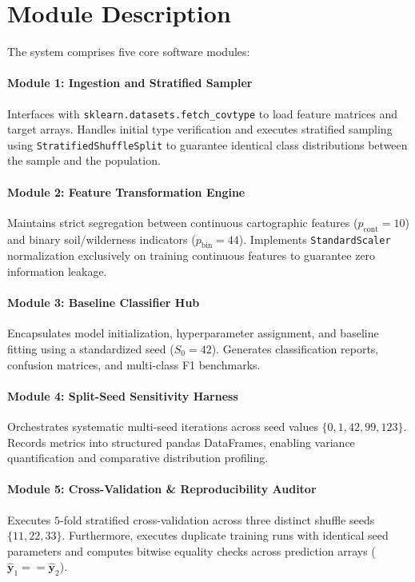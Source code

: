\section{Module Description}
\label{sec:module_description}

The system comprises five core software modules:

\paragraph{Module 1: Ingestion and Stratified Sampler}
Interfaces with \texttt{sklearn.datasets.fetch\_covtype} to load feature matrices and target arrays. Handles initial type verification and executes stratified sampling using \texttt{StratifiedShuffleSplit} to guarantee identical class distributions between the sample and the population.

\paragraph{Module 2: Feature Transformation Engine}
Maintains strict segregation between continuous cartographic features ($p_{\text{cont}} = 10$) and binary soil/wilderness indicators ($p_{\text{bin}} = 44$). Implements \texttt{StandardScaler} normalization exclusively on training continuous features to guarantee zero information leakage.

\paragraph{Module 3: Baseline Classifier Hub}
Encapsulates model initialization, hyperparameter assignment, and baseline fitting using a standardized seed ($S_0 = 42$). Generates classification reports, confusion matrices, and multi-class F1 benchmarks.

\paragraph{Module 4: Split-Seed Sensitivity Harness}
Orchestrates systematic multi-seed iterations across seed values $\{0, 1, 42, 99, 123\}$. Records metrics into structured pandas DataFrames, enabling variance quantification and comparative distribution profiling.

\paragraph{Module 5: Cross-Validation \& Reproducibility Auditor}
Executes $5$-fold stratified cross-validation across three distinct shuffle seeds $\{11, 22, 33\}$. Furthermore, executes duplicate training runs with identical seed parameters and computes bitwise equality checks across prediction arrays ($\hat{\mathbf{y}}_1 == \hat{\mathbf{y}}_2$).

